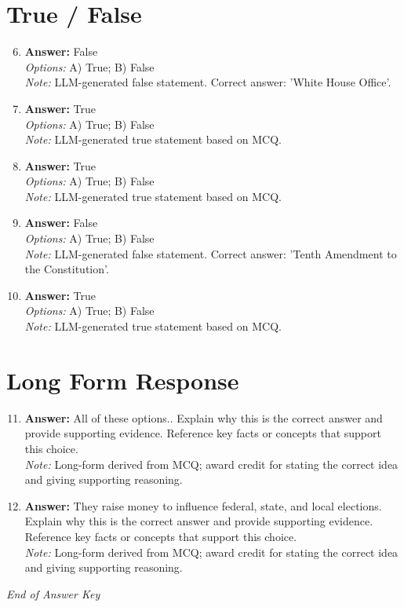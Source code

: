 \documentclass[12pt]{article}
\begin{document}
\section*{True / False}
\begin{enumerate}[label=\arabic*.]
\setcounter{enumi}{5}
\item \textbf{Answer:} False
\\ \textit{Options:} A) True; B) False
\\ \textit{Note:} LLM-generated false statement. Correct answer: 'White House Office'.
\item \textbf{Answer:} True
\\ \textit{Options:} A) True; B) False
\\ \textit{Note:} LLM-generated true statement based on MCQ.
\item \textbf{Answer:} True
\\ \textit{Options:} A) True; B) False
\\ \textit{Note:} LLM-generated true statement based on MCQ.
\item \textbf{Answer:} False
\\ \textit{Options:} A) True; B) False
\\ \textit{Note:} LLM-generated false statement. Correct answer: 'Tenth Amendment to the Constitution'.
\item \textbf{Answer:} True
\\ \textit{Options:} A) True; B) False
\\ \textit{Note:} LLM-generated true statement based on MCQ.
\end{enumerate}

\section*{Long Form Response}
\begin{enumerate}[label=\arabic*.]
\setcounter{enumi}{10}
\item \textbf{Answer:} All of these options.. Explain why this is the correct answer and provide supporting evidence. Reference key facts or concepts that support this choice.
\\ \textit{Note:} Long-form derived from MCQ; award credit for stating the correct idea and giving supporting reasoning.
\item \textbf{Answer:} They raise money to influence federal, state, and local elections. Explain why this is the correct answer and provide supporting evidence. Reference key facts or concepts that support this choice.
\\ \textit{Note:} Long-form derived from MCQ; award credit for stating the correct idea and giving supporting reasoning.
\end{enumerate}

\vfill
\noindent\textit{End of Answer Key}
\end{document}
